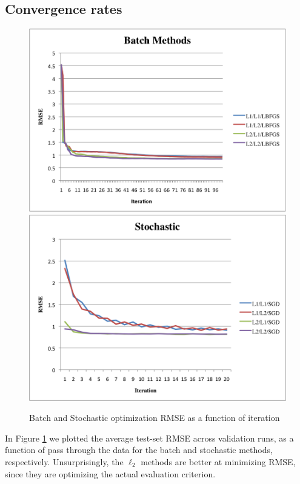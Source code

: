 \documentclass[11pt,leqno,twoside]{article}
\begin{document}
\subsection{Convergence rates}
\begin{figure}
  \centering
  \includegraphics[scale=0.49]{lbfgs-rmse.png}
  \includegraphics[scale=0.49]{stochastic-rmse.png}
  \caption{Batch and Stochastic optimization RMSE as a function of iteration}
  \label{fig:rmse-stochastic}
\end{figure}

In Figure \ref{fig:rmse-stochastic} we plotted the average test-set
RMSE across validation runs, as a function of pass through the data
for the batch and stochastic methods, respectively. Unsurprisingly,
the $\ell_2$ methods are better at minimizing RMSE, since they are
optimizing the actual evaluation criterion.
\end{document}
